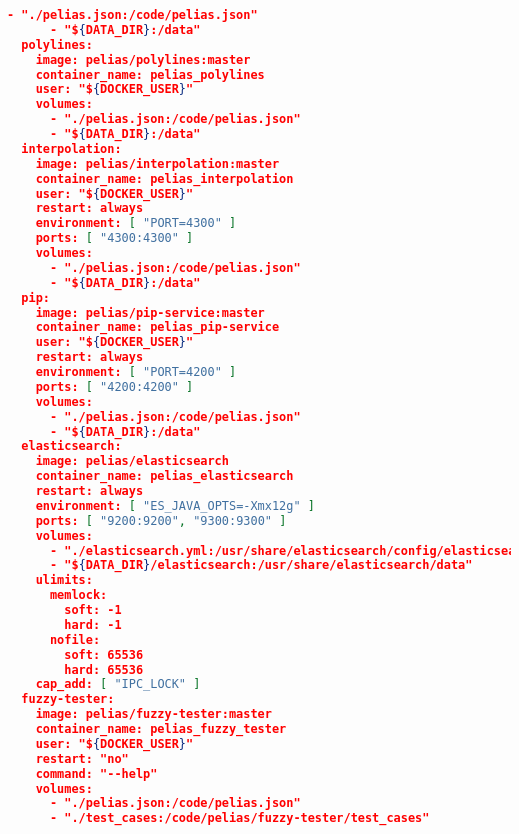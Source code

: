 \begin{lstlisting}[language=json,breaklines=true]
      - "./pelias.json:/code/pelias.json"
      - "${DATA_DIR}:/data"
  polylines:
    image: pelias/polylines:master
    container_name: pelias_polylines
    user: "${DOCKER_USER}"
    volumes:
      - "./pelias.json:/code/pelias.json"
      - "${DATA_DIR}:/data"
  interpolation:
    image: pelias/interpolation:master
    container_name: pelias_interpolation
    user: "${DOCKER_USER}"
    restart: always
    environment: [ "PORT=4300" ]
    ports: [ "4300:4300" ]
    volumes:
      - "./pelias.json:/code/pelias.json"
      - "${DATA_DIR}:/data"
  pip:
    image: pelias/pip-service:master
    container_name: pelias_pip-service
    user: "${DOCKER_USER}"
    restart: always
    environment: [ "PORT=4200" ]
    ports: [ "4200:4200" ]
    volumes:
      - "./pelias.json:/code/pelias.json"
      - "${DATA_DIR}:/data"
  elasticsearch:
    image: pelias/elasticsearch
    container_name: pelias_elasticsearch
    restart: always
    environment: [ "ES_JAVA_OPTS=-Xmx12g" ]
    ports: [ "9200:9200", "9300:9300" ]
    volumes:
      - "./elasticsearch.yml:/usr/share/elasticsearch/config/elasticsearch.yml:ro"
      - "${DATA_DIR}/elasticsearch:/usr/share/elasticsearch/data"
    ulimits:
      memlock:
        soft: -1
        hard: -1
      nofile:
        soft: 65536
        hard: 65536
    cap_add: [ "IPC_LOCK" ]
  fuzzy-tester:
    image: pelias/fuzzy-tester:master
    container_name: pelias_fuzzy_tester
    user: "${DOCKER_USER}"
    restart: "no"
    command: "--help"
    volumes:
      - "./pelias.json:/code/pelias.json"
      - "./test_cases:/code/pelias/fuzzy-tester/test_cases"
\end{lstlisting}

